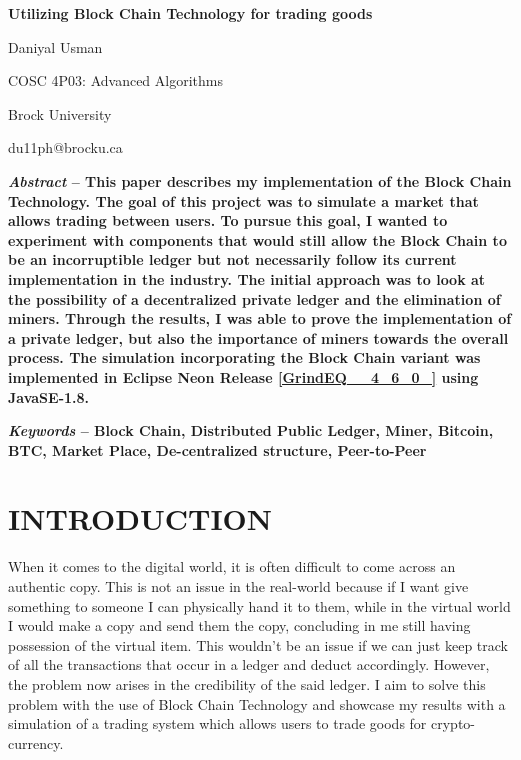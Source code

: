 \documentclass{article} %
\begin{document}


\noindent \begin{center}
\textbf{Utilizing Block Chain Technology for trading goods}

\noindent Daniyal Usman

\noindent COSC 4P03: Advanced Algorithms

\noindent Brock University

\noindent du11ph@brocku.ca
\end{center}

\noindent \begin{flushleft}
\textbf{}

\noindent \textbf{\textit{Abstract} -- This paper describes my implementation of the Block Chain Technology. The goal of this project was to simulate a market that allows trading between users. To pursue this goal, I wanted to experiment with components that would still allow the Block Chain to be an incorruptible ledger but not necessarily follow its current implementation in the industry. The initial approach was to look at the possibility of a decentralized private ledger and the elimination of miners. Through the results, I was able to prove the implementation of a private ledger, but also the importance of miners towards the overall process. The simulation incorporating the Block Chain variant was implemented in Eclipse Neon Release \eqref{GrindEQ__4_6_0_} using JavaSE-1.8. }

\noindent \textbf{\textit{Keywords} -- Block Chain, Distributed Public Ledger, Miner, Bitcoin, BTC, Market Place, De-centralized structure, Peer-to-Peer}

\noindent \textbf{}
\end{flushleft}

\noindent 
\section{INTRODUCTION}

\begin{flushleft}
When it comes to the digital world, it is often difficult to come across an authentic copy. This is not an issue in the real-world because if I want give something to someone I can physically hand it to them, while in the virtual world I would make a copy and send them the copy, concluding in me still having possession of the virtual item. This wouldn't be an issue if we can just keep track of all the transactions that occur in a ledger and deduct accordingly. However, the problem now arises in the credibility of the said ledger. I aim to solve this problem with the use of Block Chain Technology and showcase my results with a simulation of a trading system which allows users to trade goods for crypto-currency. 

\noindent 
\end{flushleft}
\end{document}
